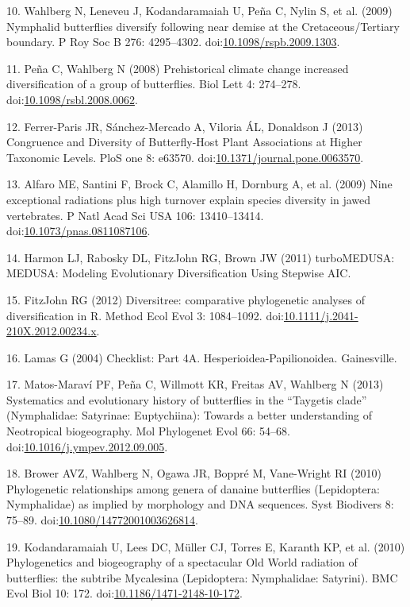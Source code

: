 \documentclass[10pt]{article}
\begin{document}
10. Wahlberg N, Leneveu J, Kodandaramaiah U, Pe\~na C, Nylin S, et al.
(2009) Nymphalid butterflies diversify following near demise at the
Cretaceous/Tertiary boundary. P Roy Soc B 276: 4295--4302.
doi:\href{http://dx.doi.org/10.1098/rspb.2009.1303}{10.1098/rspb.2009.1303}.

11. Pe\~na C, Wahlberg N (2008) Prehistorical climate change increased
diversification of a group of butterflies. Biol Lett 4: 274--278.
doi:\href{http://dx.doi.org/10.1098/rsbl.2008.0062}{10.1098/rsbl.2008.0062}.

12. Ferrer-Paris JR, S\'anchez-Mercado A, Viloria \'AL, Donaldson J (2013)
Congruence and Diversity of Butterfly-Host Plant Associations at Higher
Taxonomic Levels. PloS one 8: e63570.
doi:\href{http://dx.doi.org/10.1371/journal.pone.0063570}{10.1371/journal.pone.0063570}.

13. Alfaro ME, Santini F, Brock C, Alamillo H, Dornburg A, et al. (2009)
Nine exceptional radiations plus high turnover explain species diversity
in jawed vertebrates. P Natl Acad Sci USA 106: 13410--13414.
doi:\href{http://dx.doi.org/10.1073/pnas.0811087106}{10.1073/pnas.0811087106}.

14. Harmon LJ, Rabosky DL, FitzJohn RG, Brown JW (2011) turboMEDUSA:
MEDUSA: Modeling Evolutionary Diversification Using Stepwise AIC.

15. FitzJohn RG (2012) Diversitree: comparative phylogenetic analyses of
diversification in R. Method Ecol Evol 3: 1084--1092.
doi:\href{http://dx.doi.org/10.1111/j.2041-210X.2012.00234.x}{10.1111/j.2041-210X.2012.00234.x}.

16. Lamas G (2004) Checklist: Part 4A. Hesperioidea-Papilionoidea.
Gainesville.

17. Matos-Marav\'i PF, Pe\~na C, Willmott KR, Freitas AV, Wahlberg N (2013)
Systematics and evolutionary history of butterflies in the ``Taygetis
clade'' (Nymphalidae: Satyrinae: Euptychiina): Towards a better
understanding of Neotropical biogeography. Mol Phylogenet Evol 66:
54--68.
doi:\href{http://dx.doi.org/10.1016/j.ympev.2012.09.005}{10.1016/j.ympev.2012.09.005}.

18. Brower AVZ, Wahlberg N, Ogawa JR, Boppr\'e M, Vane-Wright RI (2010)
Phylogenetic relationships among genera of danaine butterflies
(Lepidoptera: Nymphalidae) as implied by morphology and DNA sequences.
Syst Biodivers 8: 75--89.
doi:\href{http://dx.doi.org/10.1080/14772001003626814}{10.1080/14772001003626814}.

19. Kodandaramaiah U, Lees DC, M\"uller CJ, Torres E, Karanth KP, et al.
(2010) Phylogenetics and biogeography of a spectacular Old World
radiation of butterflies: the subtribe Mycalesina (Lepidoptera:
Nymphalidae: Satyrini). BMC Evol Biol 10: 172. 
doi:\href{http://dx.doi.org/10.1186/1471-2148-10-172}{10.1186/1471-2148-10-172}.
\end{document}
